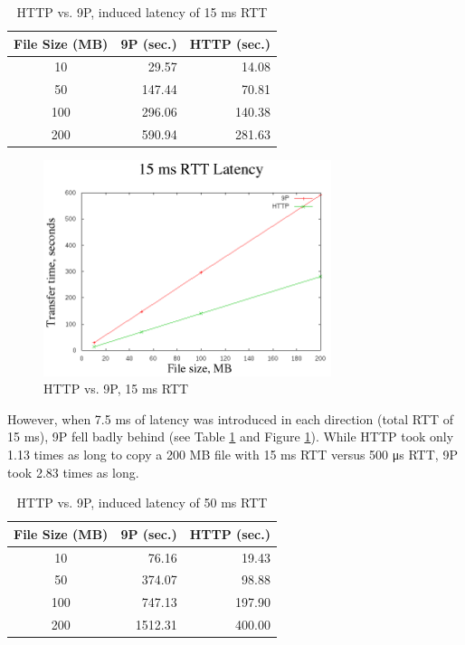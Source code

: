 \documentclass[11pt,american]{report}
\begin{document}
\begin{table}[h]
	\caption{HTTP vs. 9P, induced latency of 15 ms RTT}
	\begin{center}
		\begin{tabular}{ | c || r | r | }
			\hline
			\bf{File Size (MB)} & \bf{9P (sec.)} & \bf{HTTP (sec.)} \\ \hline
			10 & 29.57 & 14.08 \\ \hline
			50 & 147.44 & 70.81 \\ \hline
			100 & 296.06 & 140.38 \\ \hline
			200 & 590.94 & 281.63 \\ \hline		
		\end{tabular}
	\end{center}
	\label{table:15mslatency}
\end{table}

\begin{figure}[h]
	\begin{center}
		\includegraphics[width=0.75\textwidth]{15ms.png}
	\end{center}
	\caption{HTTP vs. 9P, 15 ms RTT}
	\label{figure:15ms}
\end{figure}

However, when 7.5 ms of latency was introduced in each direction (total RTT of 15 ms), 9P fell badly behind (see Table \ref{table:15mslatency} and Figure \ref{figure:15ms}). While HTTP took only 1.13 times as long to copy a 200 MB file with 15 ms RTT versus 500 μs RTT, 9P took 2.83 times as long.

\begin{table}[h]
	\caption{HTTP vs. 9P, induced latency of 50 ms RTT}	
	\begin{center}
		\begin{tabular}{ | c || r | r | }
			\hline
			\bf{File Size (MB)} & \bf{9P (sec.)} & \bf{HTTP (sec.)} \\ \hline
			10 & 76.16 & 19.43 \\ \hline
			50 & 374.07 & 98.88 \\ \hline
			100 & 747.13 & 197.90 \\ \hline
			200 & 1512.31 & 400.00 \\ \hline		
		\end{tabular}
	\end{center}
	\label{table:50mslatency}
\end{table}
\end{document}
